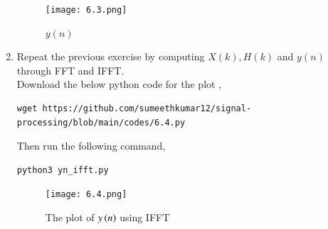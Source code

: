 \documentclass[journal,12pt,twocolumn]{IEEEtran}
\renewcommand\thesection{\arabic{section}}
\begin{document}
\begin{enumerate}[label=\thesection.\arabic*]
\begin{lstlisting}
\end{lstlisting}
\begin{figure}[!ht]
\centering
\texttt{[image: 6.3.png]}
\caption{$y(n)$}
\label{fig:6.4}
\end{figure}
\item Repeat the previous exercise by computing $X(k), H(k)$ and $y(n)$ through FFT and 
IFFT.\\
 \solution Download the below python code for the plot ,
  \begin{lstlisting}
wget https://github.com/sumeethkumar12/signal-processing/blob/main/codes/6.4.py
  \end{lstlisting}
  Then run the following command,
   \begin{lstlisting}
python3 yn_ifft.py
   \end{lstlisting}
   \begin{figure}[!ht]
     \texttt{[image: 6.4.png]}
     \centering
     \caption{The plot of $y\left(n\right)$ using IFFT}
     \label{yn_ifft}
   \end{figure}

\end{enumerate}
\end{document}
